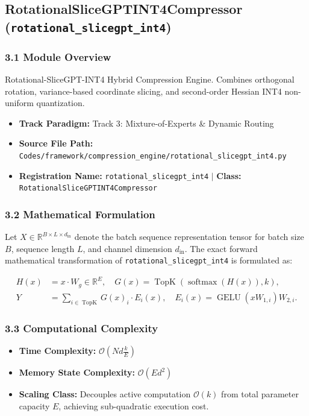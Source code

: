 \subsection{RotationalSliceGPTINT4Compressor (\texttt{rotational\_slicegpt\_int4})}
\label{sec:app_module_rotational\_slicegpt\_int4}

\subsubsection*{3.1 Module Overview}
Rotational-SliceGPT-INT4 Hybrid Compression Engine. Combines orthogonal rotation, variance-based coordinate slicing, and second-order Hessian INT4 non-uniform quantization.
\begin{itemize}
    \item \textbf{Track Paradigm:} Track 3: Mixture-of-Experts & Dynamic Routing
    \item \textbf{Source File Path:} \texttt{Codes/framework/compression\_engine/rotational\_slicegpt\_int4.py}
    \item \textbf{Registration Name:} \texttt{rotational\_slicegpt\_int4} $\mid$ \textbf{Class:} \texttt{RotationalSliceGPTINT4Compressor}
\end{itemize}

\subsubsection*{3.2 Mathematical Formulation}
Let $X \in \mathbb{R}^{B \times L \times d_{\text{in}}}$ denote the batch sequence representation tensor for batch size $B$, sequence length $L$, and channel dimension $d_{\text{in}}$. The exact forward mathematical transformation of \texttt{rotational\_slicegpt\_int4} is formulated as:

\begin{align}
H(x) &= x \cdot W_g \in \mathbb{R}^{E}, \quad G(x) = \operatorname{TopK}\left(\operatorname{softmax}(H(x)), k\right), \\
Y &= \sum_{i \in \operatorname{TopK}} G(x)_i \cdot E_i(x), \quad E_i(x) = \operatorname{GELU}(x W_{1, i}) W_{2, i}.
\end{align}


\subsubsection*{3.3 Computational Complexity}
\begin{itemize}
    \item \textbf{Time Complexity:} $\mathcal{O}(N d \frac{k}{E})$
    \item \textbf{Memory State Complexity:} $\mathcal{O}(E d^2)$
    \item \textbf{Scaling Class:} Decouples active computation $\mathcal{O}(k)$ from total parameter capacity $E$, achieving sub-quadratic execution cost.
\end{itemize}

